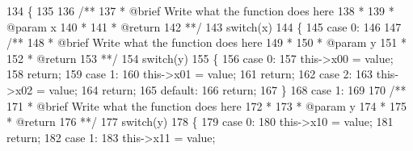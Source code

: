 \begin{DoxyCode}
134         \{
135 \textcolor{comment}{}
136 \textcolor{comment}{            /**}
137 \textcolor{comment}{             * @brief Write what the function does here}
138 \textcolor{comment}{             *}
139 \textcolor{comment}{             * @param x}
140 \textcolor{comment}{             *}
141 \textcolor{comment}{             * @return}
142 \textcolor{comment}{             **/}
143             \textcolor{keywordflow}{switch}(x)
144             \{
145                 \textcolor{keywordflow}{case} 0:
146 \textcolor{comment}{}
147 \textcolor{comment}{                    /**}
148 \textcolor{comment}{                     * @brief Write what the function does here}
149 \textcolor{comment}{                     *}
150 \textcolor{comment}{                     * @param y}
151 \textcolor{comment}{                     *}
152 \textcolor{comment}{                     * @return}
153 \textcolor{comment}{                     **/}
154                     \textcolor{keywordflow}{switch}(y)
155                     \{
156                         \textcolor{keywordflow}{case} 0:
157                             this->x00 = value;
158                             \textcolor{keywordflow}{return};
159                         \textcolor{keywordflow}{case} 1:
160                             this->x01 = value;
161                             \textcolor{keywordflow}{return};
162                         \textcolor{keywordflow}{case} 2:
163                             this->x02 = value;
164                             \textcolor{keywordflow}{return};
165                         \textcolor{keywordflow}{default}:
166                             \textcolor{keywordflow}{return};
167                     \}
168                 \textcolor{keywordflow}{case} 1:
169 \textcolor{comment}{}
170 \textcolor{comment}{                    /**}
171 \textcolor{comment}{                     * @brief Write what the function does here}
172 \textcolor{comment}{                     *}
173 \textcolor{comment}{                     * @param y}
174 \textcolor{comment}{                     *}
175 \textcolor{comment}{                     * @return}
176 \textcolor{comment}{                     **/}
177                     \textcolor{keywordflow}{switch}(y)
178                     \{
179                         \textcolor{keywordflow}{case} 0:
180                             this->x10 = value;
181                             \textcolor{keywordflow}{return};
182                         \textcolor{keywordflow}{case} 1:
183                             this->x11 = value;

\end{DoxyCode}
